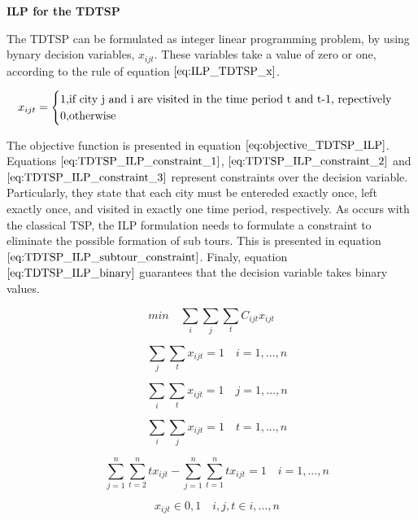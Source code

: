 \textbf{ILP for the TDTSP}

The TDTSP can be formulated as integer linear programming problem, by using bynary decision variables, $x_{ijt}$. These variables take a value of zero or one, according to the rule of equation $\ref{eq:ILP_TDTSP_x}$.

\begin{equation}
\label{eq:ILP_TDTSP_x}
	x_{ijt} =
	\begin{cases}
		1, $if city j and i are visited in the time period t and t-1, repectively$ \\
	    0, $otherwise$
	\end{cases}
\end{equation}

The objective function is presented in equation $\ref{eq:objective_TDTSP_ILP}$. Equations $\ref{eq:TDTSP_ILP_constraint_1}$, $\ref{eq:TDTSP_ILP_constraint_2}$ and $\ref{eq:TDTSP_ILP_constraint_3}$ represent constraints over the decision variable. Particularly, they state that each city must be entereded exactly once, left exactly once, and visited in exactly one time period, respectively. As occurs with the classical TSP, the ILP formulation needs to formulate a constraint to eliminate the possible formation of sub tours. This is presented in equation $\ref{eq:TDTSP_ILP_subtour_constraint}$. Finaly, equation $\ref{eq:TDTSP_ILP_binary}$ guarantees that the decision variable takes binary values.

\begin{equation}
\label{eq:objective_TDTSP_ILP}
	min \quad \sum_{i}\sum_{j}\sum_{t} C_{ijt}x_{ijt}
\end{equation}

\begin{equation}
\label{eq:TDTSP_ILP_constraint_1}
	\quad \sum_{j}\sum_{t}x_{ijt} = 1 \quad i = 1, ... ,n
\end{equation}

\begin{equation}
\label{eq:TDTSP_ILP_constraint_2}
	\quad \sum_{i}\sum_{t}x_{ijt} = 1 \quad j = 1, ... ,n
\end{equation}

\begin{equation}
\label{eq:TDTSP_ILP_constraint_3}
	\quad \sum_{i}\sum_{j}x_{ijt} = 1 \quad t = 1, ... ,n
\end{equation}

\begin{equation}
\label{eq:TDTSP_ILP_subtour_constraint}
	\quad \sum_{j = 1}^{n}\sum_{t=2}^{n}tx_{ijt} - \sum_{j = 1}^{n}\sum_{t=1}^{n}tx_{ijt}  = 1 \quad i = 1, ... ,n
\end{equation}

\begin{equation} \label{eq:constrain_10}
\quad x_{ijt} \in {0, 1} \quad i,j, t \in {i,...,n}
\end{equation}

